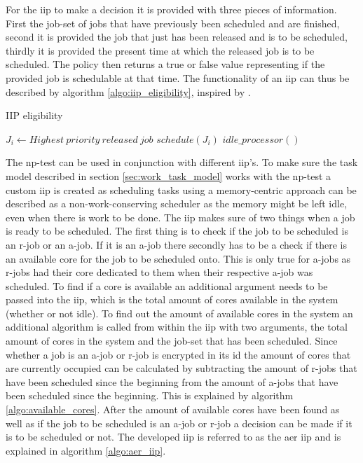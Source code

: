 \documentclass{kththesis}
\begin{document}
For the \acrshort{iip} to make a decision it is provided with three pieces of information. First
the job-set of jobs that have previously been scheduled and are finished, second it is provided the
job that just has been released and is to be scheduled, thirdly it is provided the present time at
which the released job is to be scheduled.  The policy then returns a true or false value
representing if the provided job is schedulable at that time. The functionality of an \acrshort{iip}
can thus be described by algorithm \ref{algo:iip_eligibility}, inspired by
\parencite{nasri_exact_2017}.

\begin{algorithm}
    \caption{IIP eligibility}
    \label{algo:iip_eligibility}
    \begin{algorithmic}[1]
        \State $J_i\gets Highest\ priority\ released\ job$
            \State $schedule(J_i)$
        \Else
            \State $idle\_processor()$
        \EndIf
    \end{algorithmic}
\end{algorithm}

The np-test can be used in conjunction with different \acrshort{iip}'s. To make sure the task model
described in section \ref{sec:work_task_model} works with the np-test a custom \acrshort{iip} is
created as scheduling tasks using a memory-centric approach can be described as a
non-work-conserving scheduler as the memory might be left idle, even when there is work to be done.
The \acrshort{iip} makes sure of two things when a job is ready to be scheduled. The first thing is
to check if the job to be scheduled is an \acrshort{r}-job or an \acrshort{a}-job. If it is an
\acrshort{a}-job there secondly has to be a check if there is an available core for the job to be
scheduled onto. This is only true for \acrshort{a}-jobs as \acrshort{r}-jobs had their core
dedicated to them when their respective \acrshort{a}-job was scheduled. To find if a core is
available an additional argument needs to be passed into the \acrshort{iip}, which is the total
amount of cores available in the system (whether or not idle). To find out the amount of available
cores in the system an additional algorithm is called from within the \acrshort{iip} with two
arguments, the total amount of cores in the system and the job-set that has been scheduled. Since
whether a job is an \acrshort{a}-job or \acrshort{r}-job is encrypted in its id the amount of cores
that are currently occupied can be calculated by subtracting the amount of \acrshort{r}-jobs that
have been scheduled since the beginning from the amount of \acrshort{a}-jobs that have been
scheduled since the beginning. This is explained by algorithm \ref{algo:available_cores}. After the
amount of available cores have been found as well as if the job to be scheduled is an
\acrshort{a}-job or \acrshort{r}-job a decision can be made if it is to be scheduled or not. The
developed \acrshort{iip} is referred to as the \acrshort{aer} \acrshort{iip} and is explained in
algorithm \ref{algo:aer_iip}.
\end{document}
